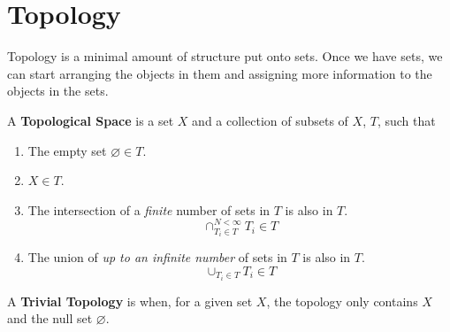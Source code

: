 \chapter{Topology}

Topology is a minimal amount of structure put onto sets.  Once we have sets, we can start arranging the objects in them and assigning more information to the objects in the sets.

\begin{definition} \label{def:topspace}
  A \textbf{Topological Space} is a set $X$ and a collection of subsets of $X$, $T$, such that
  \begin{enumerate}
    \item The empty set $\varnothing \in T$.
    \item $X \in T$.
    \item The intersection of a \textit{finite} number of sets in $T$ is also in $T$.
      \begin{equation}
        \cap_{T_i\in T}^{N < \infty} T_i \in T
      \end{equation}
    \item The union of \textit{up to an infinite number} of sets in $T$ is also in $T$.
      \begin{equation}
        \cup_{T_i \in T} T_i \in T
      \end{equation}
  \end{enumerate}
\end{definition}

\begin{example}\label{ex:trivialtop} A \textbf{Trivial Topology} is when, for a given set $X$, the topology only contains $X$ and the null set $\varnothing$.

\begin{center}
\end{center}
\end{example}

